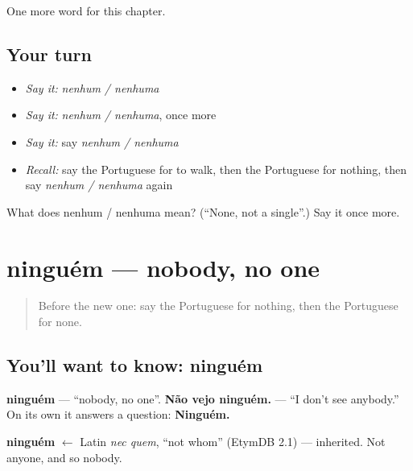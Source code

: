 \begin{grammarlens}[title={What you've built}]
One more word for this chapter.
\end{grammarlens}

\subsection*{Your turn}
\begin{itemize}
\raggedright
  \item \emph{Say it:} \emph{nenhum / nenhuma}
  \item \emph{Say it:} \emph{nenhum / nenhuma}, once more
  \item \emph{Say it:} say \emph{nenhum / nenhuma}
  \item \emph{Recall:} say the Portuguese for to walk, then the Portuguese for nothing, then say \emph{nenhum / nenhuma} again
\end{itemize}

\begin{tcolorbox}[breakable,colback=teal!4,colframe=teal!35!black,title={Before you move on}]
What does nenhum / nenhuma mean? (\textquotedblleft{}None, not a single\textquotedblright{}.) Say it once more.
\end{tcolorbox}
\section[ninguém]{ninguém — nobody, no one}

\label{lesson:PT-C134-ninguem}



\begin{quote}
Before the new one: say the Portuguese for nothing, then the Portuguese for none.
\end{quote}

\subsection*{You'll want to know: ninguém}
\textbf{ninguém} — \textquotedblleft{}nobody, no one\textquotedblright{}. \textbf{Não vejo ninguém.} — \textquotedblleft{}I don't see anybody.\textquotedblright{} On its own it answers a question: \textbf{Ninguém.}

\begin{cousinweb}
\textbf{ninguém} $\leftarrow$ Latin \emph{nec quem}, \textquotedblleft{}not whom\textquotedblright{} (EtymDB 2.1) — inherited. Not anyone, and so nobody.
\end{cousinweb}

